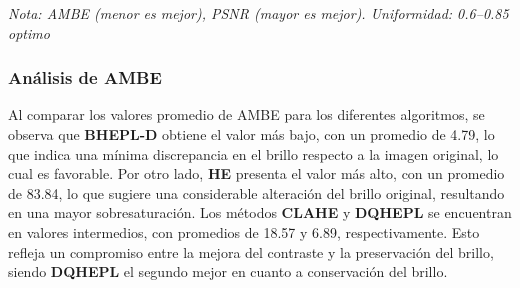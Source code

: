 \documentclass[sigchi]{acmart}
\begin{document}
\begin{table}[H]
	\centering
	\caption{Comparación estadística de los algoritmos de mejora de contraste}
	\label{tab:comparacion}
	\small

	\vspace{0.5em}
	\footnotesize%
	\textit{Nota: AMBE (menor es mejor), PSNR (mayor es mejor). Uniformidad: 0.6–0.85 optimo}
	\label{figure:global_estadisticas}
\end{table}

\subsubsection{Análisis de AMBE}
\label{subsubsec:analisis_ambe}

Al comparar los valores promedio de AMBE para los diferentes algoritmos, se observa que
\textbf{BHEPL-D} obtiene el valor más bajo, con un promedio de 4.79, lo que indica una mínima
discrepancia en el brillo respecto a la imagen original, lo cual es favorable. Por otro lado,
\textbf{HE} presenta el valor más alto, con un promedio de 83.84, lo que sugiere una
considerable alteración del brillo original, resultando en una mayor sobresaturación. Los
métodos \textbf{CLAHE} y \textbf{DQHEPL} se encuentran en valores intermedios, con promedios de
18.57 y 6.89, respectivamente. Esto refleja un compromiso entre la mejora del contraste y la
preservación del brillo, siendo \textbf{DQHEPL} el segundo mejor en cuanto a conservación del
brillo.
\end{document}

